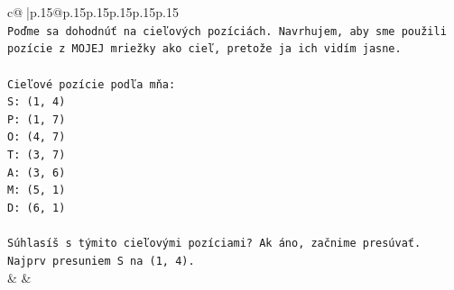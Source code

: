 \documentclass{article}
\begin{document}
{\begin{supertabular}{c@{$\;$}|p{.15\linewidth}@{}p{.15\linewidth}p{.15\linewidth}p{.15\linewidth}p{.15\linewidth}p{.15\linewidth}}
{{{\\ 
\texttt{Poďme sa dohodnúť na cieľových pozíciách. Navrhujem, aby sme použili pozície z MOJEJ mriežky ako cieľ, pretože ja ich vidím jasne.} \\
\\ 
\texttt{Cieľové pozície podľa mňa:} \\
\texttt{S: (1, 4)} \\
\texttt{P: (1, 7)} \\
\texttt{O: (4, 7)} \\
\texttt{T: (3, 7)} \\
\texttt{A: (3, 6)} \\
\texttt{M: (5, 1)} \\
\texttt{D: (6, 1)} \\
\\ 
\texttt{Súhlasíš s týmito cieľovými pozíciami? Ak áno, začnime presúvať. Najprv presuniem S na (1, 4).} \\
            }
        }
    }
    & & \\ \\


\end{supertabular}}
\end{document}
